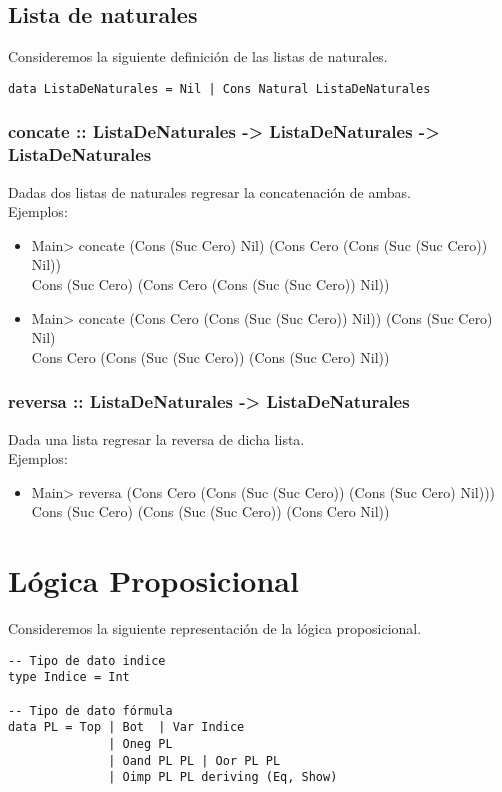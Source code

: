 \documentclass[11pt]{article}
\begin{document}
\subsection{Lista de naturales}
\label{sec:org07aa6c7}
Consideremos la siguiente definición de las listas de naturales.
\begin{verbatim}
data ListaDeNaturales = Nil | Cons Natural ListaDeNaturales
\end{verbatim}
\subsubsection{concate :: ListaDeNaturales -> ListaDeNaturales -> ListaDeNaturales}
\label{sec:orgb634ffe}
Dadas dos listas de naturales regresar la concatenación de ambas.\\
Ejemplos:
\begin{itemize}
\item Main> concate (Cons (Suc Cero) Nil) (Cons Cero (Cons (Suc (Suc Cero)) Nil))\\
Cons (Suc Cero) (Cons Cero (Cons (Suc (Suc Cero)) Nil))
\item Main> concate (Cons Cero (Cons (Suc (Suc Cero)) Nil)) (Cons (Suc Cero) Nil)\\
Cons Cero (Cons (Suc (Suc Cero)) (Cons (Suc Cero) Nil))
\end{itemize}
\subsubsection{reversa :: ListaDeNaturales -> ListaDeNaturales}
\label{sec:org7521df4}
Dada una lista regresar la reversa de dicha lista.\\
Ejemplos:
\begin{itemize}
\item Main> reversa (Cons Cero (Cons (Suc (Suc Cero)) (Cons (Suc Cero) Nil)))\\
Cons (Suc Cero) (Cons (Suc (Suc Cero)) (Cons Cero Nil))
\end{itemize}

\section{Lógica Proposicional}
\label{sec:org5af4312}
Consideremos la siguiente representación de la lógica proposicional.
\begin{verbatim}
-- Tipo de dato indice
type Indice = Int

-- Tipo de dato fórmula
data PL = Top | Bot  | Var Indice
              | Oneg PL 
              | Oand PL PL | Oor PL PL 
              | Oimp PL PL deriving (Eq, Show)
\end{verbatim}
\end{document}
